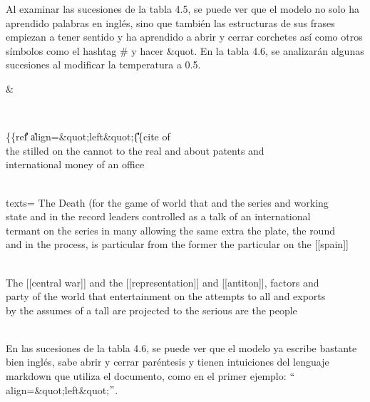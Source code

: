 \vspace{1em}

Al examinar las sucesiones de la tabla 4.5, se puede ver que el modelo no solo ha aprendido palabras en inglés, sino que también las estructuras de sus frases empiezan a tener sentido y ha aprendido a abrir y cerrar corchetes así como otros símbolos como el hashtag # y hacer \&quot. En la tabla 4.6, se analizarán algunas sucesiones al modificar la temperatura a 0.5.


\begin{table}[htbp]
\begin{center}
\begin{tabular}{&}

\\ \hline

\{\{ref\| \| \|\| \|\| \|\- \| \| align=\&quot;left\&quot;\|\| \|\| \|\| \|\| \|\| \|\| \|\| \{\{cite of \\ the stilled on the cannot to the real and about patents and \\ international money of an office
\\ 
\\ \hline

texts= The Death (for the game of world that and the series and working \\ state and in the record leaders controlled as a talk of an international \\ termant on the series in many allowing the same extra the plate, the round \\ and in the process, is particular from the former the particular on the [[spain]]
\\ 
\\ \hline

The [[central war]] and the [[representation]] and [[antiton]], factors and \\ party of the world that entertainment on the attempts to all and exports \\ by the assumes of a tall are projected to the serious are the people
\\ 
\\ \hline


\end{tabular}
\caption{Segundo modelo de Hutter: temperatura 0.5}
\label{sucesiones hutter 1}
\end{center}
\end{table}

En las sucesiones de la tabla 4.6, se puede ver que el modelo ya escribe bastante bien inglés, sabe abrir y cerrar paréntesis y  tienen intuiciones del lenguaje markdown que utiliza el documento, como en el primer ejemplo: $``$align=\&quot;left\&quot;$"$. 

